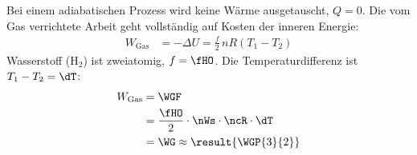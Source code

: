 Bei einem adiabatischen Prozess wird keine Wärme ausgetauscht, $Q = 0$. Die vom Gas verrichtete Arbeit geht vollständig auf Kosten der inneren Energie:
\begin{align}
 W_\text{Gas} &= -\Delta U = \frac{f}{2}\,nR\left(T_1-T_2\right)
\end{align}
Wasserstoff (H$_2$) ist zweiatomig, $f = \fHO$. Die Temperaturdifferenz ist $T_1-T_2 = \dT$:
\begin{align}
 W_\text{Gas} &= \WGF \\
   &= \frac{\fHO}{2}\cdot\nWs\cdot\ncR\cdot\dT \\
   &= \WG \approx \result{\WGP{3}{2}}
\end{align}
